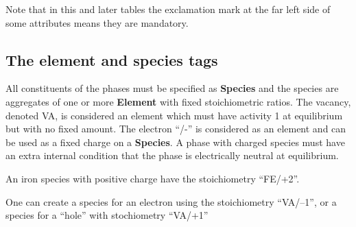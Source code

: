 \documentclass{article}
\begin{document}
Note that in this and later tables the exclamation mark at the far
left side of some attributes means they are mandatory.

\subsection{The element and species tags}\label{sec:elements}

All constituents of the phases must be specified as {\bf Species} and
the species are aggregates of one or more {\bf Element} with fixed
stoichiometric ratios.  The vacancy, denoted VA, is considered an
element which must have activity 1 at equilibrium but with no fixed
amount.  The electron ``/-'' is considered as an element and can be
used as a fixed charge on a {\bf Species}.  A phase with charged species
must have an extra internal condition that the phase is electrically
neutral at equilibrium.

An iron species with positive charge have the stoichiometry ``FE/+2''.

One can create a species for an electron using the stoichiometry
``VA/--1'', or a species for a ``hole'' with stochiometry ``VA/+1''
\end{document}
